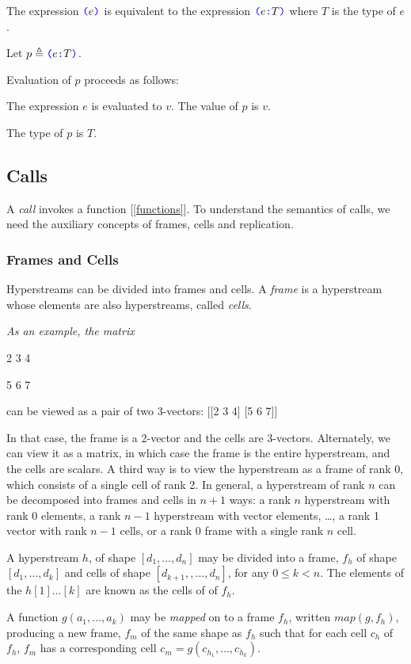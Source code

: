 \documentclass{article}
\begin{document}
The expression  $\texttt{\color{blue} (}{}e \texttt{\color{blue} )}{}$ is equivalent to the expression $\texttt{\color{blue} (}{}e \texttt{\color{blue} :}{} T \texttt{\color{blue} )}{}$ where $T$ is the type of $e$.

Let $p \triangleq \texttt{\color{blue} (}{}e \texttt{\color{blue} :}{} T \texttt{\color{blue} )}{}$.

Evaluation of $p$ proceeds as follows:

The expression $e$ is evaluated to $v$. The value of $p$ is $v$.

The type of $p$ is $T$.

\subsection{Calls}
\label{calls}

A {\em call} invokes a function [\ref{functions}]. To understand the semantics of calls, we need the auxiliary concepts of frames, cells and replication.


\subsubsection{Frames and Cells}
\label{framesAndCells}

Hyperstreams can be divided into frames and cells. A {\em frame} is a hyperstream whose elements are also hyperstreams, called {\em cells}.

{\em As an example, the matrix 

2 3 4

5 6 7

 can be viewed as a pair of two 3-vectors:
[[2 3 4] [5 6 7]]

In that case, the frame is a 2-vector and the cells are 3-vectors.  Alternately, we can view it as a matrix, in which case the frame is the entire hyperstream, and the cells are scalars. A third way is to view the hyperstream as a frame of rank 0, which consists of a single cell of rank 2. In general, a hyperstream of rank $n$ can be decomposed into frames and cells in $n+1$ ways: a rank $n$ hyperstream with rank 0 elements, a rank $n-1$ hyperstream with vector elements, …, a rank 1 vector with rank $n-1$ cells, or a rank 0 frame with a single rank $n$ cell.
}

A hyperstream $h$, of shape $[d_1, \ldots, d_n]$ may be divided into a frame, $f_h$ of shape $[d_1, \ldots, d_k]$ and cells of shape $[d_{k+1}, , \ldots, d_n]$, for any $0 \le k \lt n$.
The elements of the $h[1] \ldots [k]$ are known as the cells of of $f_h$.

A function $g(a_1, \ldots, a_k)$ may be {\em mapped} on to a frame $f_h$, written $map(g, f_h)$, producing a new frame, $f_m$ of the same shape as $f_h$ such that for each cell $c_h$ of $f_h$, $f_m$ has a corresponding cell $c_m = g(c_{h_1}, \ldots, c_{h_k})$.
\end{document}
